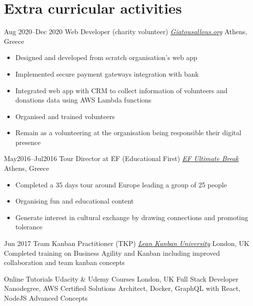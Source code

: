 \section{\normalfont Extra curricular activities}
\vspace{-.1cm}
\begin{entrylist}

\entry
{Aug 2020--Dec 2020}
{Web Developer (charity volunteer) {\normalfont \emph{\href{https://www.giatousallous.org/}{Giatousallous.org}}}}
{Athens, Greece}
\vspace{-0.6cm}
\begin{itemize}[leftmargin=.6cm]
	\item Designed and developed from scratch organisation's web app
	\item Implemented secure payment gateways integration with bank
	\item Integrated web app with CRM to collect information of volunteers and donations data using AWS Lambda functions
	\item Organised and trained volunteers
	\item Remain as a volunteering at the organisation being responsible their digital presence
\end{itemize}

\entry
{May2016–Jul2016}
{Tour Director at EF (Educational First)  {\normalfont \emph{\href{https://www.efultimatebreak.com/}{EF Ultimate Break}}}}
{Athens, Greece}
\vspace{-0.6cm}
\begin{itemize}[leftmargin=.6cm]	
	\item Completed a 35 days tour around Europe leading a group of 25 people
	\item Organising fun and educational content
	\item Generate interest in cultural exchange by drawing connections and promoting tolerance
\end{itemize}

\entry
{Jun 2017}
 {Team Kanban Practitioner (TKP) {\normalfont \emph{\href{https://edu.leankanban.com/}{Lean Kanban University}}}} 
{London, UK} 
{Completed training on Business Agility and Kanban including improved collaboration and team kanban concepts}

\entry
{Online Tutorials}
 {Udacity \& Udemy Courses}
{London, UK} 
{Full Stack Developer Nanodegree, AWS Certified Solutions Architect, Docker, GraphQL with React, NodeJS Advanced Concepts}
\end{entrylist}